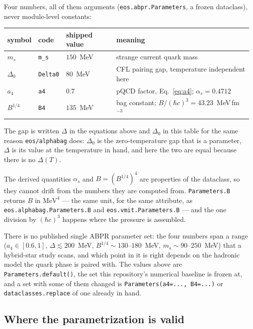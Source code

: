 \documentclass[aps,prc,onecolumn,superscriptaddress,nofootinbib,10pt]{revtex4-2}
\newcommand{\hc}{(\hbar c)^3}
\newcommand{\as}{\alpha_s}
\newcommand{\ms}{m_s}
\begin{document}
Four numbers, all of them arguments (\texttt{eos.abpr.Parameters}, a frozen
dataclass), never module-level constants:

\begin{center}
\begin{tabular}{llll}
\toprule
symbol & code & shipped value & meaning \\
\midrule
$\ms$      & \texttt{m\_s}   & $150$~MeV & strange current quark mass \\
$\Delta_0$ & \texttt{Delta0} & $80$~MeV  & CFL pairing gap, temperature independent here \\
$a_4$      & \texttt{a4}    & $0.7$     & pQCD factor, Eq.~\eqref{eq:a4}; $\as = 0.4712$ \\
$B^{1/4}$  & \texttt{B4}    & $135$~MeV & bag constant; $B/\hc = 43.23$~MeV\,fm$^{-3}$ \\
\bottomrule
\end{tabular}
\end{center}

\noindent
The gap is written $\Delta$ in the equations above and $\Delta_0$ in this table
for the same reason \texttt{eos/alphabag} does: $\Delta_0$ is the
zero-temperature gap that is a parameter, $\Delta$ is its value at the
temperature in hand, and here the two are equal because there is no
$\Delta(T)$.

The derived quantities $\as$ and $B = (B^{1/4})^4$ are properties of the
dataclass, so they cannot drift from the numbers they are computed from.
\texttt{Parameters.B} returns $B$ in $\mathrm{MeV^4}$ --- the same unit, for
the same attribute, as \texttt{eos.alphabag.Parameters.B} and
\texttt{eos.vmit.Parameters.B} --- and the one division by $\hc$ happens where
the pressure is assembled.

There is no published single ABPR parameter set: the four numbers span a range
($a_4 \in [0.6, 1]$, $\Delta \lesssim 200$~MeV, $B^{1/4} \sim 130$--$180$~MeV,
$\ms \sim 90$--$250$~MeV) that a hybrid-star study scans, and which point in
it is right depends on the hadronic model the quark phase is paired with. The
values above are \texttt{Parameters.default()}, the set this repository's
numerical baseline is frozen at, and a set with some of them changed is
\texttt{Parameters(a4=..., B4=...)} or \texttt{dataclasses.replace} of one
already in hand.

\subsection{Where the parametrization is valid}
\end{document}
